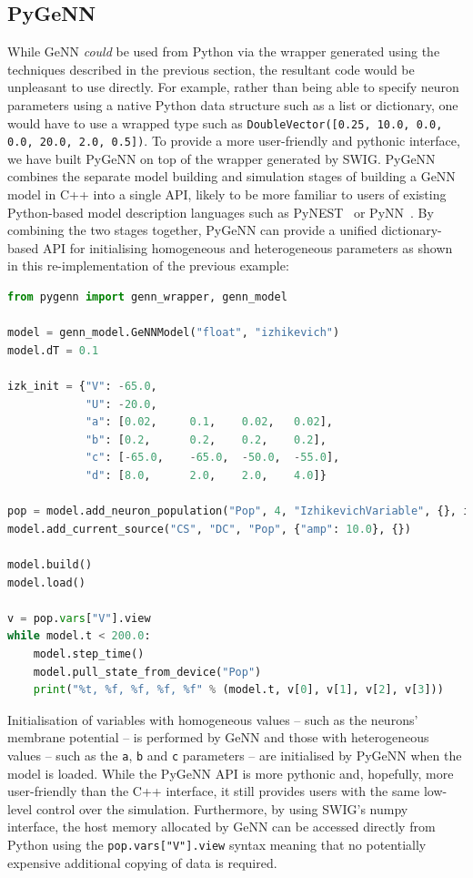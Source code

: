 \documentclass[utf8]{frontiersSCNS} %
\begin{document}
\subsection{PyGeNN}
\label{sec:methods/pygenn}
While GeNN \emph{could} be used from Python via the wrapper generated using the techniques described in the previous section, the resultant code would be unpleasant to use directly.
For example, rather than being able to specify neuron parameters using a native Python data structure such as a list or dictionary, one would have to use a wrapped type such as \lstinline{DoubleVector([0.25, 10.0, 0.0, 0.0, 20.0, 2.0, 0.5])}.
To provide a more user-friendly and pythonic interface, we have built PyGeNN on top of the wrapper generated by SWIG.
PyGeNN combines the separate model building and simulation stages of building a GeNN model in C++ into a single API, likely to be more familiar to users of existing Python-based model description languages such as PyNEST~\citep{Eppler2009} or PyNN~\citep{Davison2008}.
By combining the two stages together, PyGeNN can provide a unified dictionary-based API for initialising homogeneous and heterogeneous parameters as shown in this re-implementation of the previous example:
%
\begin{lstlisting}[language=Python]
from pygenn import genn_wrapper, genn_model

model = genn_model.GeNNModel("float", "izhikevich")
model.dT = 0.1

izk_init = {"V": -65.0,
            "U": -20.0,
            "a": [0.02,     0.1,    0.02,   0.02],
            "b": [0.2,      0.2,    0.2,    0.2],
            "c": [-65.0,    -65.0,  -50.0,  -55.0],
            "d": [8.0,      2.0,    2.0,    4.0]}

pop = model.add_neuron_population("Pop", 4, "IzhikevichVariable", {}, izk_init)
model.add_current_source("CS", "DC", "Pop", {"amp": 10.0}, {})

model.build()
model.load()

v = pop.vars["V"].view
while model.t < 200.0:
    model.step_time()
    model.pull_state_from_device("Pop")
    print("%t, %f, %f, %f, %f" % (model.t, v[0], v[1], v[2], v[3]))
\end{lstlisting}
%
Initialisation of variables with homogeneous values -- such as the neurons' membrane potential -- is performed by GeNN and those with heterogeneous values -- such as the \lstinline{a}, \lstinline{b} and \lstinline{c} parameters -- are initialised by PyGeNN when the model is loaded.
While the PyGeNN API is more pythonic and, hopefully, more user-friendly than the C++ interface, it still provides users with the same low-level control over the simulation.
Furthermore, by using SWIG's numpy~\citep{VanDerWalt2011} interface, the host memory allocated by GeNN can be accessed directly from Python using the \lstinline{pop.vars["V"].view} syntax meaning that no potentially expensive additional copying of data is required.
\end{document}
